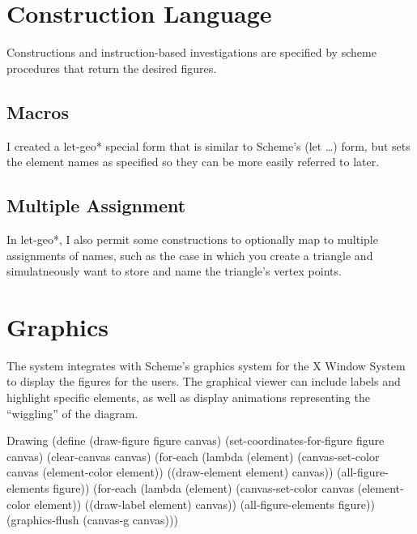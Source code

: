 \section{Construction Language}

Constructions and instruction-based investigations are specified by
scheme procedures that return the desired figures.

\subsection{Macros}

I created a let-geo* special form that is similar to Scheme's (let
\ldots) form, but sets the element names as specified so they can be more
easily referred to later.

\subsection{Multiple Assignment}

In let-geo*, I also permit some constructions to optionally map to
multiple assignments of names, such as the case in which you create a
triangle and simulatneously want to store and name the triangle's
vertex points.

\section{Graphics}

The system integrates with Scheme's graphics system for the X Window
System to display the figures for the users. The graphical viewer can
include labels and highlight specific elements, as well as display
animations representing the ``wiggling'' of the diagram.

\begin{code-listing}{Drawing}
(define (draw-figure figure canvas)
  (set-coordinates-for-figure figure canvas)
  (clear-canvas canvas)
  (for-each
   (lambda (element)
     (canvas-set-color canvas (element-color element))
     ((draw-element element) canvas))
   (all-figure-elements figure))
  (for-each
   (lambda (element)
     (canvas-set-color canvas (element-color element))
     ((draw-label element) canvas))
   (all-figure-elements figure))
  (graphics-flush (canvas-g canvas)))
\end{code-listing}

\fi
